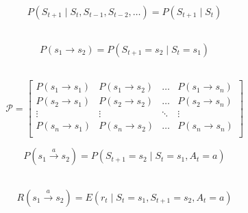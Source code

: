 \documentclass[xcolor={table}]{beamer}
\begin{document}
 \begin{frame} 
\begin{equation}
\label{eqn:markov_assumption_1}
P(S_{t + 1} \mid S_{t}, S_{t-1}, S_{t-2}, \ldots) = P(S_{t + 1} \mid S_{t})
\end{equation}

~\\

\begin{equation}
\label{eqn:markov_assumption_2}
P({s_{1} \rightarrow s_{2}}) = P(S_{t + 1}=s_{2} \mid S_{t}=s_{1})
\end{equation}

~\\

\begin{equation*}
\mathcal{P}  = \begin{bmatrix}
P({s_{1}\rightarrow s_{1}}) & P({s_{1}\rightarrow s_{2}}) & \dots     & P({s_{1}\rightarrow s_{n}}) \\
P({s_{2}\rightarrow s_{1}}) & P({s_{2}\rightarrow s_{2}}) & \dots     & P({s_{2}\rightarrow s_{n}}) \\
\vdots  &  \vdots   &  \ddots   &   \vdots  \\   
P({s_{n}\rightarrow s_{1}}) & P({s_{n}\rightarrow s_{2}}) & \dots     & P({s_{n}\rightarrow s_{n}}) \\
            \end{bmatrix}
\end{equation*}
\end{frame} 



 \begin{frame} 
\begin{equation}
\label{eqn:markov_assumption}
P({s_{1} \xrightarrow[]{a} s_{2}}) = P(S_{t + 1}=s_{2} \mid S_{t}=s_{1}, A_{t}=a)
\end{equation}

~\\

\begin{equation}
\label{eqn:expecrted_reward}
R({s_{1} \xrightarrow[]{a} s_{2}}) = E(r_t \mid S_t = s_1, S_{t+1}=s_2, A_t =a)
\end{equation}
\end{frame} 
\end{document}
